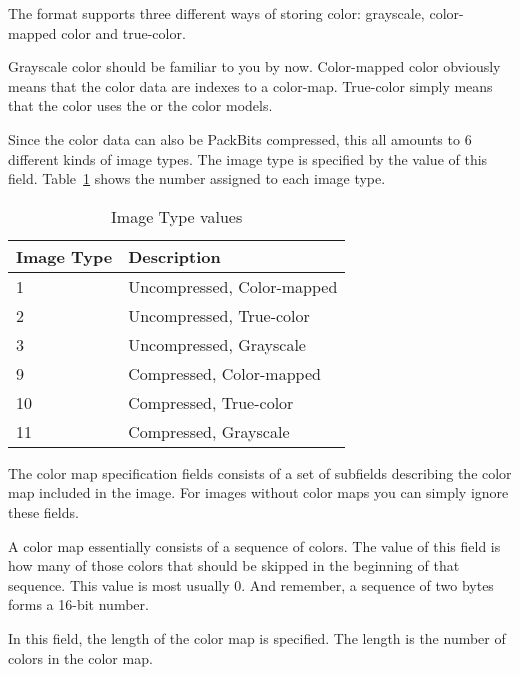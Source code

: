 
The \tga format supports three different ways of storing color:
grayscale, color-mapped color and
true-color.

Grayscale color should be familiar to you by now. Color-mapped color
obviously means that the color data are indexes to a
color-map. True-color simply means that the color uses the \rgb or the
\rgba color models.

Since the color data can also be PackBits \rle compressed, this all
amounts to $6$ different kinds of image types. The image type is
specified by the value of this field. Table~\ref{tab:imgtype} shows
the number assigned to each image type.

\begin{table}
  \centering
  \begin{tabular}{ll}
    \toprule
    Image Type & Description \\
    \midrule
    1 & Uncompressed, Color-mapped \\
    2 & Uncompressed, True-color \\
    3 & Uncompressed, Grayscale\\
    9 & Compressed, Color-mapped \\
    10 & Compressed, True-color \\
    11 & Compressed, Grayscale\\
    \bottomrule
  \end{tabular}
  \caption{\tga Image Type values}
  \label{tab:imgtype}
\end{table}


The color map specification fields consists of a set of subfields
describing the color map included in the image. For images without
color maps you can simply ignore these fields.


A color map essentially consists of a sequence of colors. The value of
this field is how many of those colors that should be skipped in the
beginning of that sequence. This value is most usually $0$. And
remember, a sequence of two bytes forms a 16-bit number.


In this field, the length of the color map is specified. The
length is the number of colors in the color map.


